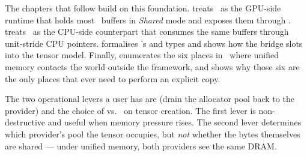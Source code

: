 The chapters that follow build on this foundation.
 treats \MLX\ as the GPU-side runtime that
holds most \Lucid\ buffers in \emph{Shared} mode and exposes them
through .  treats
\Accelerate\ as the CPU-side counterpart that consumes the same
buffers through unit-stride CPU pointers. 
formalises \Lucid's  and  types and shows
how the bridge slots into the tensor model. Finally,
 enumerates the six places in \Lucid\
where unified memory contacts the world outside the framework, and
shows why those six are the only places that ever need to perform an
explicit copy.

\begin{lucidnote}
The two operational levers a user has are
 (drain the allocator pool back to the
provider) and the choice of \code{device=`cpu'} vs.\
 on tensor creation. The first lever is
non-destructive and useful when memory pressure rises. The second
lever determines which provider's pool the tensor occupies, but
\emph{not} whether the bytes themselves are shared --- under
unified memory, both providers see the same DRAM.
\end{lucidnote}
